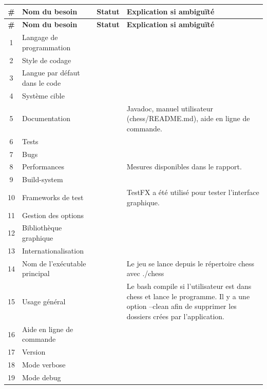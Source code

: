\documentclass{article}
\newcommand{\valid}{\textcolor{green}{\ding{108}}}  %
\begin{document}
\begin{longtable}{|c|p{5cm}|c|p{5cm}|}
    \hline
    \textbf{\#} & \textbf{Nom du besoin} & \textbf{Statut} & \textbf{Explication si ambiguïté} \\
    \hline
    \endfirsthead

    \hline
    \textbf{\#} & \textbf{Nom du besoin} & \textbf{Statut} & \textbf{Explication si ambiguïté} \\
    \hline
    \endhead

    \hline
    1 & Langage de programmation & \valid & \\
    \hline
    2 & Style de codage & \valid & \\
    \hline
    3 & Langue par défaut dans le code & \valid & \\
    \hline
    4 & Système cible & \valid & \\
    \hline
    5 & Documentation & \valid & Javadoc, manuel utilisateur (chess/README.md), aide en ligne de commande. \\
    \hline
    6 & Tests & \valid & \\
    \hline
    7 & Bugs & \valid & \\
    \hline
    8 & Performances & \valid & Mesures disponibles dans le rapport. \\
    \hline
    9 & Build-system & \valid & \\
    \hline
    10 & Frameworks de test & \valid & TestFX a été utilisé pour tester l'interface graphique. \\
    \hline
    11 & Gestion des options & \valid & \\
    \hline
    12 & Bibliothèque graphique & \valid & \\
    \hline
    13 & Internationalisation & \valid & \\
    \hline
    14 & Nom de l’exécutable principal & \valid & Le jeu se lance depuis le répertoire chess avec ./chess\\
    \hline
    15 & Usage général & \valid & Le bash compile si l'utilisateur est dans chess et lance le programme. Il y a une option --clean afin de supprimer les dossiers crées par l'application. \\
    \hline
    16 & Aide en ligne de commande & \valid & \\
    \hline
    17 & Version & \valid & \\
    \hline
    18 & Mode verbose & \valid & \\
    \hline
    19 & Mode debug & \valid & \\

\end{longtable}
\end{document}

